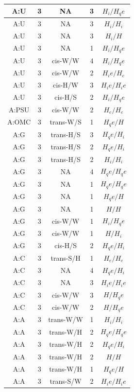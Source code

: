 \begin{center}
\begin{longtable}{c|c|c|c|c}
A:U & 3 & NA & 3 & $H_i/H_qe$ \\  \hline
A:U & 3 & NA & 3 & $H_i/H_i$ \\  \hline
A:U & 3 & NA & 3 & $H_i/H$ \\  \hline
A:U & 3 & NA & 1 & $H_i/H_qe$ \\  \hline
A:U & 3 & cis-W/W & 4 & $H_i/H_qe$ \\  \hline
A:U & 3 & cis-W/W & 2 & $H_ie/H_e$ \\  \hline
A:U & 3 & cis-H/W & 3 & $H_ie/H_ie$ \\  \hline
A:U & 3 & cis-H/S & 2 & $H_i/H_qe$ \\  \hline
A:PSU & 3 & cis-W/W & 2 & $H_e/H_e$ \\  \hline
A:OMC & 3 & trans-W/S & 1 & $H_qe/H$ \\  \hline
A:G & 3 & trans-H/S & 3 & $H_qe/H_i$ \\  \hline
A:G & 3 & trans-H/S & 2 & $H_qe/H_i$ \\  \hline
A:G & 3 & trans-H/S & 2 & $H_i/H_i$ \\  \hline
A:G & 3 & NA & 4 & $H_qe/H_qe$ \\  \hline
A:G & 3 & NA & 1 & $H_qe/H_qe$ \\  \hline
A:G & 3 & NA & 1 & $H_qe/H$ \\  \hline
A:G & 3 & NA & 1 & $H/H$ \\  \hline
A:G & 3 & cis-W/W & 1 & $H_i/H_qe$ \\  \hline
A:G & 3 & cis-W/W & 1 & $H/H_i$ \\  \hline
A:G & 3 & cis-H/S & 2 & $H_qe/H_i$ \\  \hline
A:C & 3 & trans-S/H & 1 & $H_e/H_e$ \\  \hline
A:C & 3 & NA & 4 & $H_qe/H_i$ \\  \hline
A:C & 3 & NA & 3 & $H_ie/H_ie$ \\  \hline
A:C & 3 & cis-W/W & 3 & $H/H_qe$ \\  \hline
A:C & 3 & cis-W/W & 2 & $H/H_qe$ \\  \hline
A:A & 3 & trans-W/W & 1 & $H_i/H_i$ \\  \hline
A:A & 3 & trans-W/H & 2 & $H_qe/H_qe$ \\  \hline
A:A & 3 & trans-W/H & 2 & $H_qe/H_i$ \\  \hline
A:A & 3 & trans-W/H & 2 & $H/H$ \\  \hline
A:A & 3 & trans-W/H & 1 & $H_qe/H$ \\  \hline
A:A & 3 & trans-S/W & 2 & $H_ie/H_ie$ \\  \hline

\end{longtable}
\end{center}
